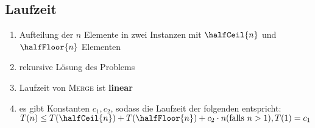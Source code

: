 	\subsection{Laufzeit}
		\begin{enumerate}
			\item Aufteilung der $n$ Elemente in zwei Instanzen mit $\halfCeil{n}$ und $\halfFloor{n}$ Elementen
			\item rekursive Lösung des Problems
			\item Laufzeit von \textsc{Merge} ist \textbf{linear}
			\item es gibt Konstanten $c_1, c_2$, sodass die Laufzeit der folgenden entspricht:\\
				$T(n) \leq T(\halfCeil{n}) + T(\halfFloor{n})+ c_2 \cdot n (\text{falls } n > 1), T(1) = c_1 $
		\end{enumerate}